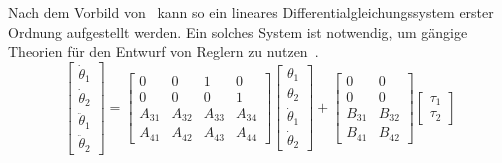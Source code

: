 Nach dem Vorbild von~\cite{Cazzolato.2011} kann so ein lineares Differentialgleichungssystem erster Ordnung aufgestellt werden. 
Ein solches System ist notwendig, um gängige Theorien für den Entwurf von Reglern zu nutzen~\citep{Werner.2013}. 
\begin{equation}
\begin{bmatrix}
\dot{\theta}_1 \\ 
\dot{\theta}_2 \\ 
\ddot{\theta}_1 \\ 
\ddot{\theta}_2
\end{bmatrix}
=
\begin{bmatrix}
0 & 0 & 1 & 0 \\ 
0 & 0 & 0 & 1 \\ 
A_{31} & A_{32} & A_{33} & A_{34} \\ 
A_{41} & A_{42} & A_{43} & A_{44}
\end{bmatrix}
\begin{bmatrix}
\theta_1 \\ 
\theta_2 \\ 
\dot{\theta}_1 \\
\dot{\theta}_2
\end{bmatrix}
+
\begin{bmatrix}
0 & 0 \\ 
0 & 0 \\ 
B_{31} & B_{32} \\ 
B_{41} & B_{42}
\end{bmatrix}
\begin{bmatrix}
\tau_1 \\ 
\tau_2
\end{bmatrix}
\end{equation}

